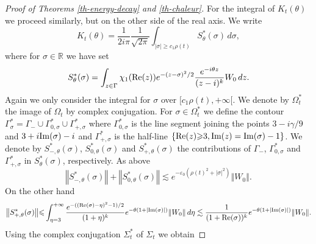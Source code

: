 \documentclass[10pt, a4paper,reqno]{amsart}
\theoremstyle{plain}
\theoremstyle{definition}
\theoremstyle{remark}
\begin{document}
\begin{proof}[Proof of Theorems \ref{th-energy-decay} and \ref{th-chaleur}]
{\noindent {\bf $\bullet$}\quad } For the integral of $K_t({\theta})$ we proceed similarly, but on the other side of the real axis. We write 
\begin{equation*} 
K_t({\theta}) = \frac 1 {2i\pi}  \frac 1 {\sqrt {2\pi}}  \int_{{\left\vert {\sigma}\right\vert} {\geqslant} c_1 \rho(t)} S_{\theta}^*(\sigma) \, d\sigma,
\end{equation*}
where for $\sigma \in {\mathbb{R}}$ we have set 
\begin{equation*} 
S_{\theta}^*(\sigma) = \int_{z \in {\Gamma}} {\chi}_1({\mathop{\rm{Re}}\nolimits}(z)) e^{-(z-\sigma)^2 / 2} \frac {e^{-i{\theta} z}}{(z-i)^k} W_0 \, dz.
\end{equation*}
Again we only consider the integral for ${\sigma}$ over $[c_1 \rho(t),+\infty[$. We denote by ${\Omega}_t^*$ the image of ${\Omega}_t$ by complex conjugation.
For $\sigma \in {\Omega}_t^*$ we define the contour ${\Gamma}_\sigma^* = {\Gamma}_- \cup {\Gamma}_{0,\sigma}^* \cup {\Gamma}_{+,\sigma}^*$ where ${\Gamma}_{0,\sigma}^*$ is the line segment joining the points $3 - i{\gamma} /9$ and $3 + i{\mathop{\rm{Im}}\nolimits}(\sigma)-i$ and ${\Gamma}_{+,\sigma}^*$ is the half-line ${\left\{ {{\mathop{\rm{Re}}\nolimits}(z) {\geqslant} 3, {\mathop{\rm{Im}}\nolimits}(z) = {\mathop{\rm{Im}}\nolimits}(\sigma)-1} \right\}}$. We denote by $S_{-,{\theta}}^*(\sigma)$, $S_{0,{\theta}}^*(\sigma)$ and $S_{+,{\theta}}^*(\sigma)$ the contributions of ${\Gamma}_-$, ${\Gamma}_{0,\sigma}^*$ and ${\Gamma}_{+,\sigma}^*$ in $S_{\theta}^*(\sigma)$, respectively. As above 
\begin{equation} \label{estim-S-star}
{\left\Vert {S_{-,{\theta}}^*(\sigma)}\right\Vert} + {\left\Vert {S_{0,{\theta}}^*(\sigma)}\right\Vert} \lesssim e^{-{\varepsilon}_0(\rho(t)^2 + {\left\vert \sigma\right\vert}^2)} {\left\Vert {W_0}\right\Vert}.
\end{equation}
On the other hand
\begin{equation*}
{\left\Vert {S_{+,{\theta}}^*(\sigma)}\right\Vert} {\leqslant} \int_{{\eta} = 3}^{+\infty} \frac {e^{-(({\mathop{\rm{Re}}\nolimits}(\sigma)-{\eta})^2 - 1 )/2}}{(1+ {\eta})^k} e^{-{\theta} (1+{\left\vert {{\mathop{\rm{Im}}\nolimits}({\sigma})}\right\vert})} {\left\Vert {W_0}\right\Vert} \, d{\eta} \lesssim \frac 1 {(1+{\mathop{\rm{Re}}\nolimits}(\sigma))^k} e^{-{\theta} (1+{\left\vert {{\mathop{\rm{Im}}\nolimits}({\sigma})}\right\vert})}{\left\Vert {W_0}\right\Vert}.
\end{equation*}
Using the complex conjugation $\Sigma_t^*$ of $\Sigma_t$ we obtain

\end{proof}
\end{document}
